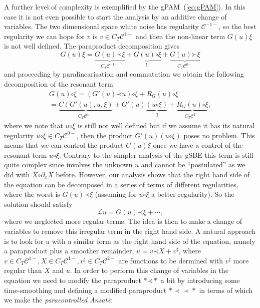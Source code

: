 \documentclass[a4paper, 11pt]{article}
\newcommand{\tmtextit}[1]{{\itshape{#1}}}
\newcommand{\para}{\mathord{\prec}}
\newcommand{\lpara}{\mathord{\succ}}
\newcommand{\mpara}{\mathord{\prec\!\!\!\prec}}
\newcommand{\reso}{\mathord{\circ}}
\begin{document}
A further level of complexity is exemplified by the gPAM~(\ref{eq:gPAM}). In
this case it is not even possible to start the analysis by an additive change
of variables. The two dimensional space white noise has regularity
$\mathcal{C}^{- 1 -}$, so the best regularity we can hope for $v$ is $v \in
C_T \mathcal{C}^{1 -}$ and then the non-linear term $G (u) \xi$ is not well
defined. The paraproduct decomposition gives
\[ G (u) \xi = \underbrace{G (u) \para \xi}_{C_T \mathcal{C}^{- 1 -}} +
   \underbrace{G (u) \reso \xi}_{!!} + \underbrace{G (u) \lpara \xi}_{C_T
   \mathcal{C}^{0 -}} \]
and proceeding by paralinearisation and commutation we obtain the following
decomposition of the resonant term
\begin{gather}
  G (u) \reso \xi = (G' (u) \para u) \reso \xi + R_G (u) \reso \xi\\
  = \underbrace{C (G' (u), u, \xi)}_{C_T \mathcal{C}^{1 -}} + G' (u)
  \underbrace{(u \reso \xi)}_{!!} + \underbrace{R_G (u) \reso \xi}_{C_T
  \mathcal{C}^{1 -}},
\end{gather}
where we note that $u \reso \xi$ is still not well defined but if we assume it
has its natural regularity $u \reso \xi \in C_T \mathcal{C}^{0 -}$, then the
product $G' (u) (u \reso \xi)$ poses no problem. This means that we can
control the product $G (u) \xi$ once we have a control of the resonant term $u
\reso \xi$. Contrary to the simpler analysis of the gSBE this term is still
quite complex since involves the unknown $u$ and cannot be ``postulated'' as
we did with $X \reso \partial_x X$ before. However, our analysis shows that
the right hand side of the equation can be decomposed in a series of terms of
different regularities, where the worst is $G (u) \para \xi$ (assuming for $u
\reso \xi$ a better regularity). So the solution should satisfy
\[ \mathcal{L}u = G (u) \para \xi + \cdots, \]
where we neglected more regular terms. The idea is then to make a change of
variables to remove this irregular term in the right hand side. A natural
approach is to look for $u$ with a similar form as the right hand side of the
equation, namely a paraproduct plus a smoother remainder, $u = v \para X +
v^{\sharp}$, where $v \in C_T \mathcal{C}^{1 -}, X \in C_T \mathcal{C}^{1 -},
v^{\sharp} \in C_T \mathcal{C}^{2 -}$ are functions to be dermined with
$v^{\sharp}$ more regular than $X$ and $u$. In order to perform this change of
variables in the equation we need to modify the paraproduct $\ast \para \ast$
a bit by introducing some time-smoothing and defining a modified paraproduct
$\ast \mpara \ast$ in terms of which we make the \tmtextit{paracontrolled
Ansatz}:
\end{document}
